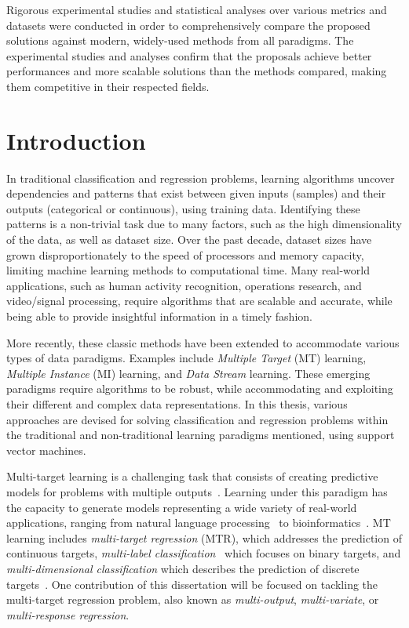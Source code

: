 \documentclass[reqno]{vcuthesis}
\numberwithin{equation}{chapter}
\begin{document}
{Rigorous experimental studies and statistical analyses over various metrics and datasets were conducted in order to comprehensively compare the proposed solutions against modern, widely-used methods from all paradigms. The experimental studies and analyses confirm that the proposals achieve better performances and more scalable solutions than the methods compared, making them competitive in their respected fields.
}\\

\tableofcontents
\listofalgorithmsvcu
\listoftables
\listoffigures
\clearpage


\chapter{Introduction \label{chap:chapintro}}
In traditional classification and regression problems, learning algorithms uncover dependencies and patterns that exist between given inputs (samples) and their outputs (categorical or continuous), using training data. Identifying these patterns is a non-trivial task due to many factors, such as the high dimensionality of the data, as well as dataset size. Over the past decade, dataset sizes have grown disproportionately to the speed of processors and memory capacity, limiting machine learning methods to computational time. Many real-world applications, such as human activity recognition, operations research, and video/signal processing, require algorithms that are scalable and accurate, while being able to provide insightful information in a timely fashion.

More recently, these classic methods have been extended to accommodate various types of data paradigms. Examples include \textit{Multiple Target} (MT) learning, \textit{Multiple Instance} (MI) learning, and \textit{Data Stream} learning. These emerging paradigms require algorithms to be robust, while accommodating and exploiting their different and complex data representations. In this thesis, various approaches are devised for solving classification and regression problems within the traditional and non-traditional learning paradigms mentioned, using support vector machines. 

Multi-target learning is a challenging task that consists of creating predictive models for problems with multiple outputs~\cite{Baxter1997,Caruana1997,thrun1996learning}. Learning under this paradigm has the capacity to generate models representing a wide variety of real-world applications, ranging from natural language processing~\cite{Jeong2009} to bioinformatics~\cite{Lui2010}. MT learning includes \textit{multi-target regression} (MTR), which addresses the prediction of continuous targets, \textit{multi-label classification}~\cite{Zhang20141819} which focuses on binary targets, and \textit{multi-dimensional classification} which describes the prediction of discrete targets~\cite{Borchani2015}. One contribution of this dissertation will be focused on tackling the multi-target regression problem, also known as \textit{multi-output}, \textit{multi-variate}, or \textit{multi-response regression}. 
\end{document}
